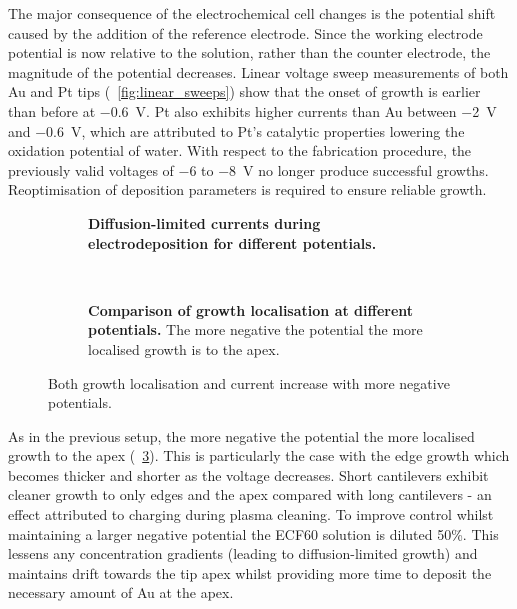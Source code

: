 \documentclass{article}
\begin{document}
The major consequence of the electrochemical cell changes is the potential shift caused by the addition of the reference electrode. Since the working electrode potential is now relative to the solution, rather than the counter electrode, the magnitude of the potential decreases. Linear voltage sweep measurements of both Au and Pt tips (\figurename~\ref{fig:linear_sweeps}) show that the onset of growth is earlier than before at \SI{-0.6}{V}. Pt also exhibits higher currents than Au between \SI{-2}{V} and \SI{-0.6}{V}, which are attributed to Pt's catalytic properties lowering the oxidation potential of water. With respect to the fabrication procedure, the previously valid voltages of $-6$ to \SI{-8}{V} no longer produce successful growths. Reoptimisation of deposition parameters is required to ensure reliable growth.

\begin{figure}[h]
\centering
\begin{subfigure}[t]{0.48\textwidth}
\caption[Diffusion-limited currents during electrodeposition for different potentials.]{\textbf{Diffusion-limited currents during electrodeposition for different potentials.}}
\label{fig:voltage_saturation_current}
\end{subfigure}
\ \
\begin{subfigure}[t]{0.48\textwidth}
\caption[Comparison of growth localisation at different potentials.]{\textbf{Comparison of growth localisation at different potentials.} The more negative the potential the more localised growth is to the apex.}
\label{fig:growth_localisation}
\end{subfigure}
\caption{Both growth localisation and current increase with more negative potentials.}
\end{figure}

As in the previous setup, the more negative the potential the more localised growth to the apex (\figurename~\ref{fig:growth_localisation}). This is particularly the case with the edge growth which becomes thicker and shorter as the voltage decreases. Short cantilevers exhibit cleaner growth to only edges and the apex compared with long cantilevers - an effect attributed to charging during plasma cleaning. To improve control whilst maintaining a larger negative potential the ECF60 solution is diluted 50\%. This lessens any concentration gradients (leading to diffusion-limited growth) and maintains drift towards the tip apex whilst providing more time to deposit the necessary amount of Au at the apex.
\end{document}
